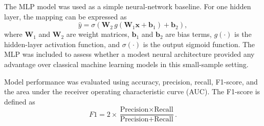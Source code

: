 The MLP model was used as a simple neural-network baseline. For one hidden layer, the mapping can be expressed as
\begin{equation}
\hat{y} = \sigma\left(\mathbf{W}_2 \, g(\mathbf{W}_1 \mathbf{x} + \mathbf{b}_1) + \mathbf{b}_2\right),
\end{equation}
where $\mathbf{W}_1$ and $\mathbf{W}_2$ are weight matrices, $\mathbf{b}_1$ and $\mathbf{b}_2$ are bias terms, $g(\cdot)$ is the hidden-layer activation function, and $\sigma(\cdot)$ is the output sigmoid function. The MLP was included to assess whether a modest neural architecture provided any advantage over classical machine learning models in this small-sample setting.

Model performance was evaluated using accuracy, precision, recall, F1-score, and the area under the receiver operating characteristic curve (AUC). The F1-score is defined as
\begin{equation}
F1 = 2 \times \frac{\text{Precision} \times \text{Recall}}{\text{Precision} + \text{Recall}}.
\end{equation}
